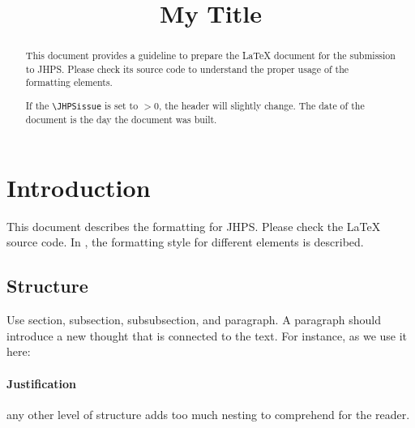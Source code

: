 \documentclass{jhps}
\begin{document}


\title{My Title}


\maketitle

\begin{abstract}
This document provides a guideline to prepare the LaTeX document for the submission to JHPS.
Please check its source code to understand the proper usage of the formatting elements.

If the \verb|\JHPSissue| is set to $>0$, the header will slightly change.
The date of the document is the day the document was built.
\end{abstract}

\section{Introduction}
\label{sec:intro}

This document describes the formatting for JHPS.
Please check the LaTeX source code.
In , the formatting style for different elements is described.

\subsection{Structure}

Use section, subsection, subsubsection, and paragraph.
A paragraph should introduce a new thought that is connected to the text.
For instance, as we use it here:

\paragraph{Justification} any other level of structure adds too much nesting to comprehend for the reader.
\end{document}
